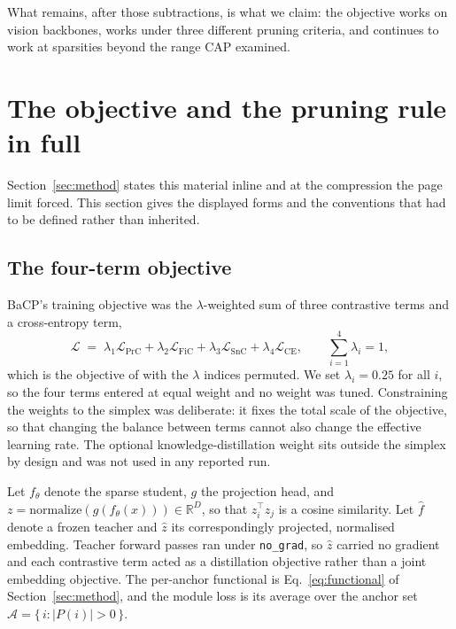 What remains, after those subtractions, is what we claim: the objective works on
vision backbones, works under three different pruning criteria, and continues to
work at sparsities beyond the range CAP examined.

\section{The objective and the pruning rule in full}
\label{sec:app:method}

Section~\ref{sec:method} states this material inline and at the compression the
page limit forced. This section gives the displayed forms and the conventions
that had to be defined rather than inherited.

\subsection{The four-term objective}

BaCP's training objective was the $\lambda$-weighted sum of three contrastive
terms and a cross-entropy term,
%
\begin{equation}
\label{eq:objective}
\mathcal{L} \;=\; \lambda_1 \mathcal{L}_{\mathrm{PrC}}
                + \lambda_2 \mathcal{L}_{\mathrm{FiC}}
                + \lambda_3 \mathcal{L}_{\mathrm{SnC}}
                + \lambda_4 \mathcal{L}_{\mathrm{CE}},
\qquad \sum_{i=1}^{4}\lambda_i = 1 ,
\end{equation}
%
which is the objective of \citet{xu2022cap} with the $\lambda$ indices permuted.
We set $\lambda_i = 0.25$ for all $i$, so the four terms entered at equal weight
and no weight was tuned. Constraining the weights to the simplex was deliberate:
it fixes the total scale of the objective, so that changing the balance between
terms cannot also change the effective learning rate. The optional
knowledge-distillation weight sits outside the simplex by design and was not
used in any reported run.

Let $f_\theta$ denote the sparse student, $g$ the projection head, and
$z = \mathrm{normalize}(g(f_\theta(x))) \in \mathbb{R}^{D}$, so that
$z_i^{\top} z_j$ is a cosine similarity. Let $\hat f$ denote a frozen teacher and
$\hat z$ its correspondingly projected, normalised embedding. Teacher forward
passes ran under \texttt{no\_grad}, so $\hat z$ carried no gradient and each
contrastive term acted as a distillation objective rather than a joint embedding
objective. The per-anchor functional is Eq.~\eqref{eq:functional} of
Section~\ref{sec:method}, and the module loss is its average over the anchor set
$\mathcal{A} = \{\, i : |P(i)| > 0 \,\}$.

